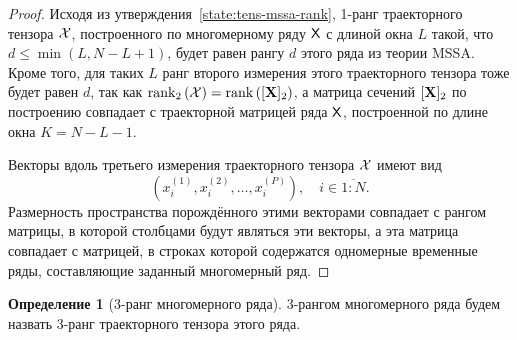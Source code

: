\documentclass[specialist,
    substylefile = spbu.rtx,
    subf,href,colorlinks=true, 12pt]{disser}
\theoremstyle{plain}
\theoremstyle{definition}
\newtheorem{definition}{Определение}[section]
\theoremstyle{remark}
\begin{document}
    \begin{proof}
        Исходя из утверждения~\ref{state:tens-mssa-rank}, 1-ранг
        траекторного тензора $\mathcal{X}$, построенного по многомерному ряду $\mathsf{X}$ с длиной окна
        $L$ такой, что $d \leqslant\min(L, N-L+1)$,
        будет равен рангу $d$ этого ряда из теории MSSA.
        Кроме того, для таких $L$ ранг второго измерения этого траекторного тензора
        тоже будет равен $d$, так как $\operatorname{rank}_2\left(\mathcal{X}\right) =
        \operatorname{rank}\left([\mathbf{X}]_2\right)$,
        а матрица сечений $[\mathbf{X}]_2$ по построению совпадает с траекторной матрицей ряда $\mathsf{X}$, построенной по длине
        окна $K = N - L - 1$.

        Векторы вдоль третьего измерения траекторного тензора $\mathcal{X}$ имеют вид
        \[
            \left(x_i^{(1)}, x_i^{(2)}, \ldots, x_i^{(P)}\right), \quad i \in \overline{1:N}.
        \]
        Размерность пространства порождённого этими векторами совпадает с рангом матрицы,
        в которой столбцами будут являться эти векторы, а эта матрица совпадает с матрицей, в строках которой содержатся одномерные временные ряды, составляющие заданный многомерный ряд.
    \end{proof}

%
    \begin{definition}[3-ранг многомерного ряда]
        3-рангом многомерного ряда будем назвать 3-ранг траекторного тензора этого ряда.
    \end{definition}
\end{document}
